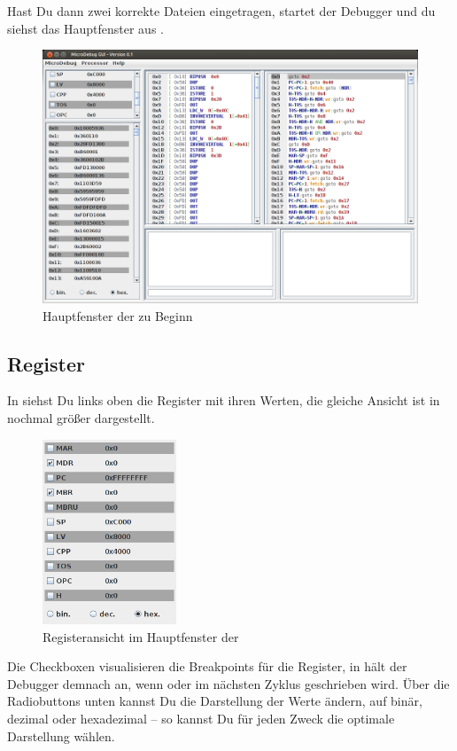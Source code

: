 Hast Du dann zwei korrekte Dateien eingetragen, startet der Debugger und du siehst das Hauptfenster aus .

\begin{figure}[h]
	\centering
	\includegraphics[width=0.8\linewidth]{images/main-frame-onbegin}
	\caption{Hauptfenster der \mdg zu Beginn}
\end{figure}

\subsection{Register}
In  siehst Du links oben die Register mit ihren Werten, die gleiche Ansicht ist in  nochmal größer dargestellt.

\begin{figure}[h]
	\centering
	\includegraphics[width=4cm]{images/main-frame-registers}
	\caption{Registeransicht im Hauptfenster der \mdg}
\end{figure}

Die Checkboxen visualisieren die Breakpoints für die Register, in  hält der Debugger demnach an, wenn  oder  im nächsten Zyklus geschrieben wird. Über die Radiobuttons unten kannst Du die Darstellung der Werte ändern, auf binär, dezimal oder hexadezimal -- so kannst Du für jeden Zweck die optimale Darstellung wählen.

